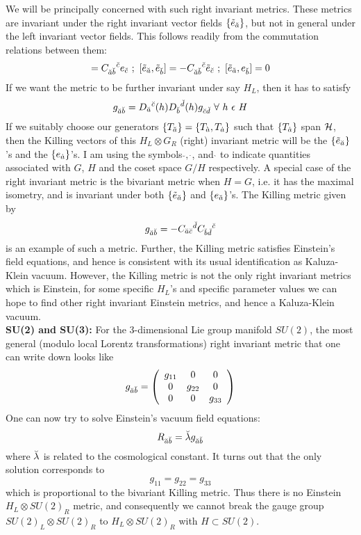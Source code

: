 \documentclass[a4paper,12pt]{article}
\begin{document}
We will be principally concerned with such right invariant metrics. These metrics are invariant under the right invariant vector fields $\{\tilde{e}_{\breve{a}}\}$, but not in general under the left invariant vector fields. This follows readily from the commutation relations between them:
\begin{equation}
[e_{\as},e_{\bs}]=C_{\as\bs}{}^{\cs}e_{\cs}\ ;\ [\et_{\as},\et_{\bs}]=-C_{\as\bs}{}^{\cs}\et_{\cs}\ ;\ [\et_{\as},e_{\bs}]=0
\end{equation}
If we want the metric to be further invariant under say $H_L$, then it has to satisfy
\begin{equation}
g_{\as\bs}=D_{\as}{}^{\cs}(h)D_{\bs}{}^{\ds}(h)g_{\cs\ds}\ \forall\  h\ \e \ H
\end{equation}
If we suitably choose our generators $\{T_{\breve{a}}\}=\{T_{\grave{a}},T_{\dot{a}}\}$ such that $\{T_{\dot{a}}\}$ span $\cal{H}$, then the Killing vectors of this $H_L\otimes G_R$ (right) invariant metric will be the $\{\tilde{e}_{\breve{a}}\}$'s and the $\{e_{\dot{a}}\}$'s. I am using the symbols $\breve{},\ \dot{}$, and $\grave{}$ to indicate quantities associated with $G$, $H$ and the coset space $G/H$ respectively. A special case of the right invariant metric is the bivariant metric when $H=G$, i.e. it has the maximal isometry, and is invariant under both $\{\tilde{e}_{\breve{a}}\}$ and $\{e_{\breve{a}}\}$'s. The Killing metric given by
\begin{equation}
g_{\breve{a}\breve{b}}=-C_{\breve{a}\breve{c}}{}^{\breve{d}}C_{\breve{b}\breve{d}}{}^{\breve{c}}
\end{equation}
is an example of such a metric. Further, the Killing metric satisfies Einstein's field equations,  and hence is consistent with its usual identification as Kaluza-Klein vacuum. However, the Killing metric is not the only  right invariant metrics which is Einstein, for some specific $H_L$'s and specific parameter values we can  hope to find other right invariant Einstein metrics, and hence a Kaluza-Klein vacuum.
\vspace{5mm}
\\ 
{\bf SU(2) and SU(3):} For the 3-dimensional Lie group manifold $SU(2)$, the most general (modulo local Lorentz transformations) right invariant metric that one can write down looks like 
\begin{equation}
g_{\breve{a}\breve{b}}=\left( \begin{array}{ccc}
g_{11} & 0& 0\\
0 & g_{22}& 0\\
0& 0&g_{33}
\end{array} \right)
\end{equation}
One can now try to solve Einstein's vacuum field equations:
\begin{equation}
R_{\breve{a}\breve{b}}=\breve{\lambda}g_{\breve{a}\breve{b}}
\end{equation}
where $\breve{\lambda}$ is related to the cosmological constant. It turns out that the only solution corresponds to
\begin{equation}
g_{11}=g_{22}=g_{33}
\end{equation}
which is proportional to the bivariant Killing metric. Thus there is no Einstein $H_L\otimes SU(2)_R$ metric,  and consequently we cannot break the gauge group $SU(2)_L\otimes SU(2)_R$ to $H_L\otimes SU(2)_R$ with $H\subset SU(2)$.
\end{document}
